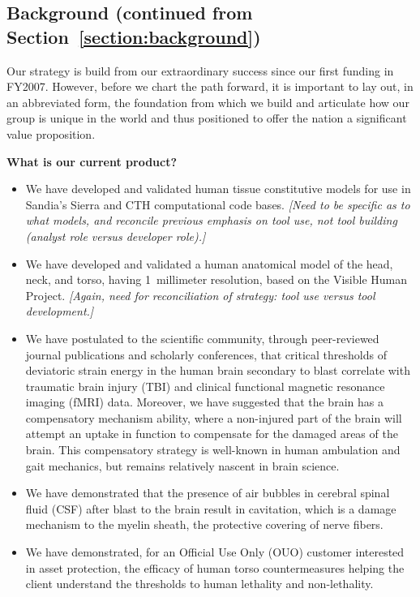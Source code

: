 \documentclass[12pt,reqno]{amsart}
\begin{document}
\subsection{Background (continued from Section~\ref{section:background})}
Our strategy is build from our extraordinary success since our first 
funding in FY2007.  However, before we chart the path forward, it is 
important to lay out, in an abbreviated form, the foundation from which we 
build and articulate how our group is unique in the world and thus 
positioned to offer the nation a significant value proposition.  

{\bf What is our current product?}  
\begin{itemize}
\item We have developed 
and validated human tissue constitutive models for use in Sandia's Sierra 
and CTH computational code bases.  {\em [Need to be specific as to what
models, and reconcile previous emphasis on tool use, not tool building 
(analyst role versus developer role).]}
\item We have developed and validated a human 
anatomical model of the head, neck, and torso, having 1~millimeter resolution, 
based on the Visible Human Project.  {\em [Again, need for reconciliation of
strategy: tool use versus tool development.]}
\item We have postulated to the 
scientific community, through peer-reviewed journal publications and
scholarly conferences, 
that critical thresholds of deviatoric strain 
energy in the human brain secondary to blast correlate with traumatic brain 
injury (TBI) and clinical functional magnetic resonance imaging (fMRI) data.
Moreover, we have suggested that the brain has a compensatory mechanism
ability, where a non-injured part of the brain will attempt an 
uptake in function to compensate for the damaged areas of the brain.  
This compensatory strategy is well-known in human ambulation and 
gait mechanics, but remains relatively nascent in brain science.
\item We have demonstrated that the presence of air bubbles
in cerebral spinal fluid (CSF) after blast to the brain result in 
cavitation, which is a damage mechanism to the myelin sheath, the protective
covering of nerve fibers.
\item We have demonstrated, for an Official Use Only (OUO) customer 
interested in asset protection, the efficacy of human torso countermeasures
helping the client understand the thresholds to human 
lethality and non-lethality.



\end{itemize}
\end{document}
